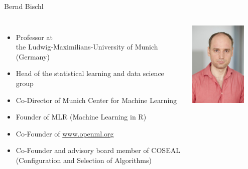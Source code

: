 \begin{frame}[c]{Bernd Bischl}


\begin{columns}
	
	
	\begin{itemize}
		\item Professor at\\ the Ludwig-Maximilians-University of Munich (Germany)
		\item Head of the statistical learning and data science group
        \item Co-Director of Munich Center for Machine Learning
        \item Founder of MLR (Machine Learning in R)
		\item Co-Founder of \url{www.openml.org}
		\item Co-Founder and advisory board member of COSEAL\\ (Configuration and Selection of Algorithms)
	\end{itemize}
	
	
	\includegraphics[width=0.8\textwidth]{images/bischl.jpg}
	
\end{columns}

\end{frame}
